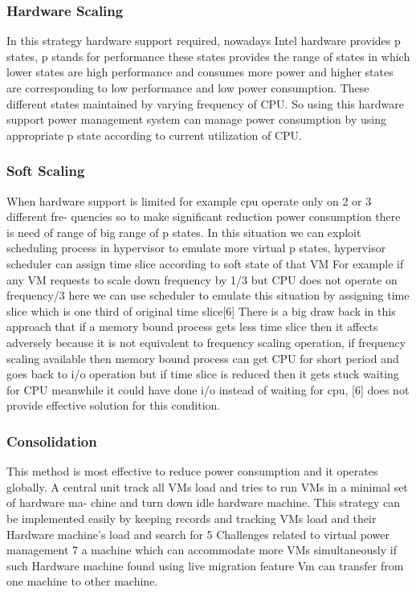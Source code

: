 \documentclass[seminar,twoside]{iitbreport}
\begin{document}
\subsubsection{Hardware Scaling}
In this strategy hardware support required, nowadays Intel hardware provides p states, p
stands for performance these states provides the range of states in which lower states are
high performance and consumes more power and higher states are corresponding to low
performance and low power consumption. These different states maintained by varying
frequency of CPU. So using this hardware support power management system can manage
power consumption by using appropriate p state according to current utilization of CPU.
\subsubsection{Soft Scaling}
When hardware support is limited for example cpu operate only on 2 or 3 different fre-
quencies so to make significant reduction power consumption there is need of range of
big range of p states. In this situation we can exploit scheduling process in hypervisor
to emulate more virtual p states, hypervisor scheduler can assign time slice according to
soft state of that VM For example if any VM requests to scale down frequency by 1/3 but
CPU does not operate on frequency/3 here we can use scheduler to emulate this situation
by assigning time slice which is one third of original time slice[6] There is a big draw
back in this approach that if a memory bound process gets less time slice then it affects
adversely because it is not equivalent to frequency scaling operation, if frequency scaling
available then memory bound process can get CPU for short period and goes back
to i/o operation but if time slice is reduced then it gets stuck waiting for CPU meanwhile
it could have done i/o instead of waiting for cpu, [6] does not provide effective solution for
this condition.
\subsubsection{Consolidation}
This method is most effective to reduce power consumption and it operates globally. A
central unit track all VMs load and tries to run VMs in a minimal set of hardware ma-
chine and turn down idle hardware machine. This strategy can be implemented easily by
keeping records and tracking VMs load and their Hardware machine’s load and search for
5
Challenges related to virtual power management
7
a machine which can accommodate more VMs simultaneously if such Hardware machine
found using live migration feature Vm can transfer from one machine to other machine.
\end{document}
